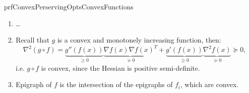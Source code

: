 \begin{prf}{prfConvexPerservingOptsConvexFunctions}
    \begin{enumerate}
        \item 
            \ldots
        \item 
            Recall that $g$ is a convex and monotonely increasing function, then: 
            \begin{equation*}
                \nabla^2 (g \circ f) = \underbrace{g''(f(x))}_{\geq 0} \underbrace{\nabla f(x) \nabla {f(x)}^T }_{\succeq 0} + \underbrace{g'(f(x))}_{\geq 0} \underbrace{\nabla^2 f(x)}_{\succeq 0} \succeq 0,
            \end{equation*}
            i\@.e\@. $g \circ f$ is convex, since the Hessian is positive semi-definite.
        \item 
            Epigraph of $f$ is the intersection of the epigraphs of $f_i$, which are convex.
    \end{enumerate}
    \vspace*{-0.2cm}
\end{prf}




